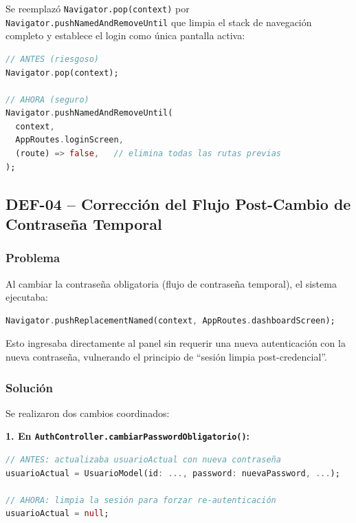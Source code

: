 \documentclass[12pt,a4paper]{article}
\begin{document}
Se reemplazó \texttt{Navigator.pop(context)} por
\texttt{Navigator.pushNamedAndRemoveUntil} que limpia el stack de navegación completo
y establece el login como única pantalla activa:

\begin{lstlisting}[language=Dart, caption={Navegación post-registro corregida}]
// ANTES (riesgoso)
Navigator.pop(context);

// AHORA (seguro)
Navigator.pushNamedAndRemoveUntil(
  context,
  AppRoutes.loginScreen,
  (route) => false,   // elimina todas las rutas previas
);
\end{lstlisting}

\subsection{DEF-04 -- Corrección del Flujo Post-Cambio de Contraseña Temporal}

\subsubsection{Problema}

Al cambiar la contraseña obligatoria (flujo de contraseña temporal), el sistema ejecutaba:
\begin{lstlisting}[language=Dart]
Navigator.pushReplacementNamed(context, AppRoutes.dashboardScreen);
\end{lstlisting}
Esto ingresaba directamente al panel sin requerir una nueva autenticación con la nueva
contraseña, vulnerando el principio de ``sesión limpia post-credencial''.

\subsubsection{Solución}

Se realizaron dos cambios coordinados:

\textbf{1. En \texttt{AuthController.cambiarPasswordObligatorio()}:}
\begin{lstlisting}[language=Dart, caption={Limpieza de sesión al cambiar contraseña}]
// ANTES: actualizaba usuarioActual con nueva contraseña
usuarioActual = UsuarioModel(id: ..., password: nuevaPassword, ...);

// AHORA: limpia la sesión para forzar re-autenticación
usuarioActual = null;
\end{lstlisting}
\end{document}
